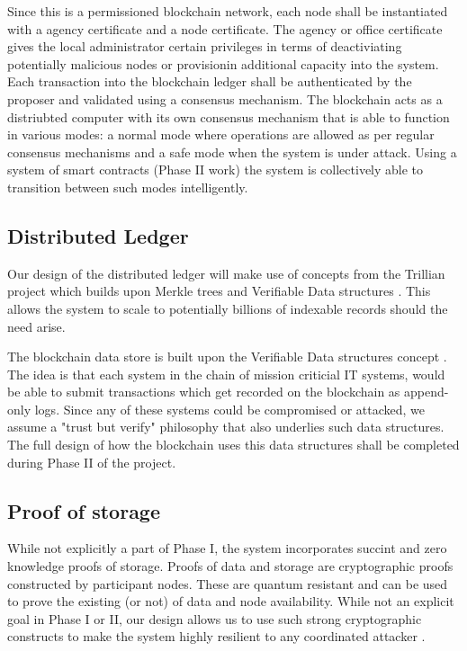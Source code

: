 Since this is a permissioned blockchain network, each node shall be instantiated with a agency certificate and a node
certificate. The agency or office certificate gives the local administrator certain privileges in terms of deactiviating
potentially malicious nodes or provisionin additional capacity into the system. Each transaction into the blockchain
ledger shall be authenticated by the proposer and validated using a consensus mechanism. The blockchain acts as a
distriubted computer with its own consensus mechanism that is able to function in various modes: a normal mode where
operations are allowed as per regular consensus mechanisms and a safe mode when the system is under attack. Using a
system of smart contracts (Phase II work) the system is collectively able to transition between such modes intelligently.

\subsection{Distributed Ledger}

Our design of the distributed ledger will make use of concepts from the Trillian project which builds upon Merkle trees
and Verifiable Data structures \cite{verifiable2015}. This allows the system to scale to potentially billions of
indexable records should the need arise.

The blockchain data store is built upon the Verifiable Data structures concept \cite{verfiable2015}. The idea is that each
system in the chain of mission criticial IT systems, would be able to submit transactions which get recorded on the
blockchain as append-only logs. Since any of these systems could be compromised or attacked, we assume a "trust but
verify" philosophy that also underlies such data structures. The full design of how the blockchain uses this data
structures shall be completed during Phase II of the project.

\subsection{Proof of storage}

While not explicitly a part of Phase I, the system incorporates succint and zero knowledge proofs of storage. Proofs
of data and storage are cryptographic proofs constructed by participant nodes. These are quantum resistant and can be
used to prove the existing (or not) of data and node availability. While not an explicit goal in Phase I or II, our
design allows us to use such strong cryptographic constructs to make the system highly resilient to any coordinated
attacker \cite{ben2019}.


